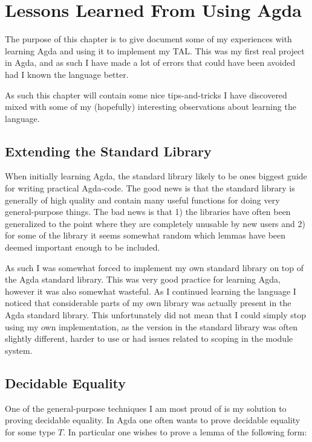 \chapter{Lessons Learned From Using Agda}
\label{chap:hindsight}

The purpose of this chapter is to give document some of my experiences with
learning Agda and using it to implement my TAL. This was my first real project
in Agda, and as such I have made a lot of errors that could have been avoided
had I known the language better.

As such this chapter will contain some nice tips-and-tricks I have discovered
mixed with some of my (hopefully) interesting observations about learning the
language.

\section{Extending the Standard Library}

When initially learning Agda, the standard library likely to be ones biggest
guide for writing practical Agda-code. The good news is that the standard
library is generally of high quality and contain many useful functions for doing
very general-purpose things. The bad news is that 1) the libraries have often
been generalized to the point where they are completely unusable by new users
and 2) for some of the library it seems somewhat random which lemmas have been
deemed important enough to be included.

As such I was somewhat forced to implement my own standard library on top of the
Agda standard library. This was very good practice for learning Agda, however it
was also somewhat wasteful. As I continued learning the language I noticed that
considerable parts of my own library was actually present in the Agda standard
library. This unfortunately did not mean that I could simply stop using my own
implementation, as the version in the standard library was often slightly
different, harder to use or had issues related to scoping in the module system.

\section{Decidable Equality}
\label{sec:deceq}

One of the general-purpose techniques I am most proud of is my solution to
proving decidable equality. In Agda one often wants to prove decidable equality
for some type $T$. In particular one wishes to prove a lemma of the following
form:

